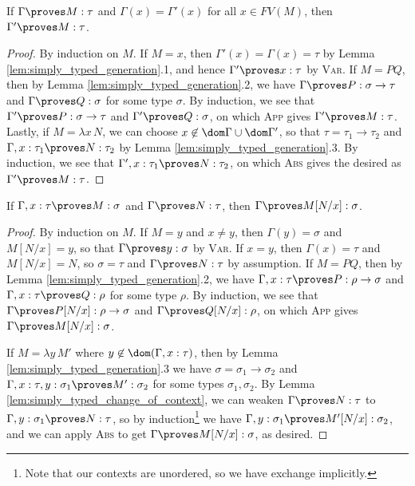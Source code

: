 \documentclass[reqno]{amsart}
\begin{document}
    \begin{lemma}\label{lem:simply_typed_change_of_context}
        If $\Gamma\proves M:\tau$ and $\Gamma(x)=\Gamma'(x)$ for all $x\in FV(M)$, then $\Gamma'\proves M:\tau$.
    \end{lemma}
    \begin{proof}
        By induction on $M$. If $M=x$, then $\Gamma'(x)=\Gamma(x)=\tau$ by Lemma \ref{lem:simply_typed_generation}.1, and hence $\Gamma'\proves x:\tau$ by \textsc{Var}. If $M=PQ$, then by Lemma \ref{lem:simply_typed_generation}.2, we have $\Gamma\proves P:\sigma\rightarrow\tau$ and $\Gamma\proves Q:\sigma$ for some type $\sigma$. By induction, we see that $\Gamma'\proves P:\sigma\to\tau$ and $\Gamma'\proves Q:\sigma$, on which \textsc{App} gives $\Gamma'\proves M:\tau$. Lastly, if $M=\lambda x\,N$, we can choose $x\not\in\dom\Gamma\cup\dom\Gamma'$, so that $\tau=\tau_1\rightarrow\tau_2$ and $\Gamma,x:\tau_1\proves N:\tau_2$ by Lemma \ref{lem:simply_typed_generation}.3. By induction, we see that $\Gamma',x:\tau_1\proves N:\tau_2$, on which \textsc{Abs} gives the desired as $\Gamma'\proves M:\tau$.
    \end{proof}

    \begin{lemma}
        If $\Gamma,x:\tau\proves M:\sigma$ and $\Gamma\proves N:\tau$, then $\Gamma\proves M[N/x]:\sigma$.
    \end{lemma}
    \begin{proof}
        By induction on $M$. If $M=y$ and $x\neq y$, then $\Gamma(y)=\sigma$ and $M[N/x]=y$, so that $\Gamma\proves y:\sigma$ by \textsc{Var}. If $x=y$, then $\Gamma(x)=\tau$ and $M[N/x]=N$, so $\sigma=\tau$ and $\Gamma\proves N:\tau$ by assumption. If $M=PQ$, then by Lemma \ref{lem:simply_typed_generation}.2, we have $\Gamma,x:\tau\proves P:\rho\rightarrow\sigma$ and $\Gamma,x:\tau\proves Q:\rho$ for some type $\rho$. By induction, we see that $\Gamma\proves P[N/x]:\rho\to\sigma$ and $\Gamma\proves Q[N/x]:\rho$, on which \textsc{App} gives $\Gamma\proves M[N/x]:\sigma$.

        If $M=\lambda y\,M'$ where $y\not\in\dom(\Gamma,x:\tau)$, then by Lemma \ref{lem:simply_typed_generation}.3 we have $\sigma=\sigma_1\rightarrow\sigma_2$ and $\Gamma,x:\tau,y:\sigma_1\proves M':\sigma_2$ for some types $\sigma_1,\sigma_2$. By Lemma \ref{lem:simply_typed_change_of_context}, we can weaken $\Gamma\proves N:\tau$ to $\Gamma,y:\sigma_1\proves N:\tau$, so by induction\footnote{Note that our contexts are unordered, so we have exchange implicitly.} we have $\Gamma,y:\sigma_1\proves M'[N/x]:\sigma_2$, and we can apply \textsc{Abs} to get $\Gamma\proves M[N/x]:\sigma$, as desired.
    \end{proof}
\end{document}
